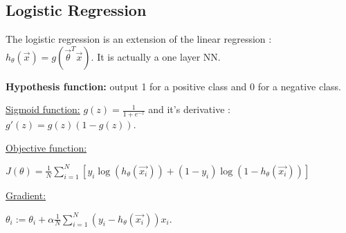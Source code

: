 \subsection*{Logistic Regression}
The logistic regression is an extension of the linear regression : $h_\theta(\overrightarrow{x})=g(\overrightarrow{\theta}^T\overrightarrow{x})$.
It is actually a one layer NN.

\textbf{Hypothesis function:} output 1 for a positive class and 0 for a negative class.

\underline{Sigmoid function:} $g(z)=\frac{1}{1+e^{-z}}$ and it's derivative : $g'(z)=g(z)(1-g(z))$.

\underline{Objective function:}

$J(\theta)=\frac{1}{N}\sum_{i=1}^{N}[y_i\log(h_\theta(\overrightarrow{x_i}))+(1-y_i)\log(1-h_\theta(\overrightarrow{x_i}))]$

\underline{Gradient:}

$\theta_i := \theta_i + \alpha\frac{1}{N}\sum_{i=1}^{N}(y_i-h_\theta(\overrightarrow{x_i}))x_i$.